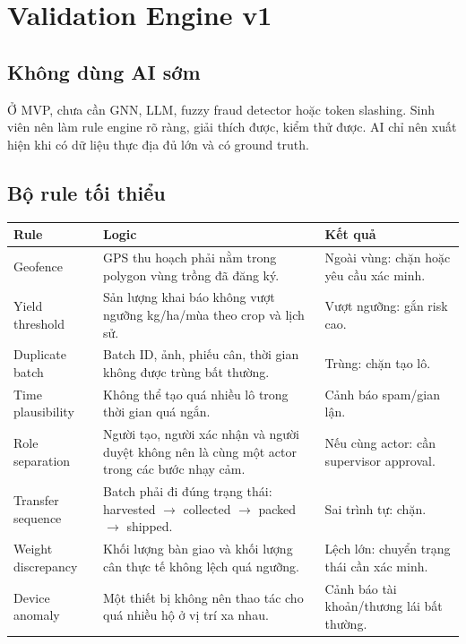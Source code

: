 \documentclass[12pt,a4paper]{article}
\begin{document}
\section{Validation Engine v1}

\subsection{Không dùng AI sớm}

Ở MVP, chưa cần GNN, LLM, fuzzy fraud detector hoặc token slashing. Sinh viên nên làm rule engine rõ ràng, giải thích được, kiểm thử được. AI chỉ nên xuất hiện khi có dữ liệu thực địa đủ lớn và có ground truth.

\subsection{Bộ rule tối thiểu}

\begin{longtable}{p{3.5cm}p{5.5cm}p{4.5cm}}
\toprule
\textbf{Rule} & \textbf{Logic} & \textbf{Kết quả} \\
\midrule
\endhead
Geofence & GPS thu hoạch phải nằm trong polygon vùng trồng đã đăng ký. & Ngoài vùng: chặn hoặc yêu cầu xác minh. \\
\addlinespace
Yield threshold & Sản lượng khai báo không vượt ngưỡng kg/ha/mùa theo crop và lịch sử. & Vượt ngưỡng: gắn risk cao. \\
\addlinespace
Duplicate batch & Batch ID, ảnh, phiếu cân, thời gian không được trùng bất thường. & Trùng: chặn tạo lô. \\
\addlinespace
Time plausibility & Không thể tạo quá nhiều lô trong thời gian quá ngắn. & Cảnh báo spam/gian lận. \\
\addlinespace
Role separation & Người tạo, người xác nhận và người duyệt không nên là cùng một actor trong các bước nhạy cảm. & Nếu cùng actor: cần supervisor approval. \\
\addlinespace
Transfer sequence & Batch phải đi đúng trạng thái: harvested $\rightarrow$ collected $\rightarrow$ packed $\rightarrow$ shipped. & Sai trình tự: chặn. \\
\addlinespace
Weight discrepancy & Khối lượng bàn giao và khối lượng cân thực tế không lệch quá ngưỡng. & Lệch lớn: chuyển trạng thái cần xác minh. \\
\addlinespace
Device anomaly & Một thiết bị không nên thao tác cho quá nhiều hộ ở vị trí xa nhau. & Cảnh báo tài khoản/thương lái bất thường. \\
\bottomrule
\end{longtable}
\end{document}
